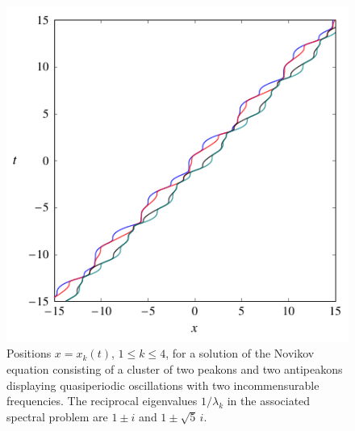 \documentclass[10pt,a4paper]{article} \pdfoutput=1 
\begin{document}
\begin{figure}
  \centering \includegraphics[width=1.0\linewidth]{graphics/novikov-4cluster-quasiperiodic.pdf}
  \caption{Positions $x = x_k(t)$, $1 \le k \le 4$, for a solution of the Novikov equation
    consisting of a cluster of two peakons and two antipeakons
    displaying quasiperiodic oscillations with two incommensurable frequencies.
    The reciprocal eigenvalues $1/\lambda_k$ in the associated spectral problem
    are $1 \pm i$ and $1 \pm \sqrt5 \, i$.}
  \label{fig:novikov-4cluster-quasiperiodic}
\end{figure}
\end{document}

